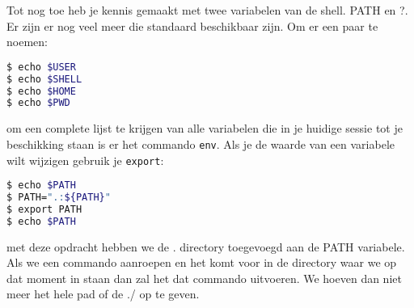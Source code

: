 Tot nog toe heb je kennis gemaakt met twee variabelen van de shell. PATH en ?. Er zijn er nog veel meer die standaard beschikbaar zijn. Om er een paar te noemen:
\begin{lstlisting}[language=bash]
$ echo $USER
$ echo $SHELL
$ echo $HOME
$ echo $PWD
\end{lstlisting}
om een complete lijst te krijgen van alle variabelen die in je huidige sessie tot je beschikking staan is er het commando \texttt{env}.
Als je de waarde van een variabele wilt wijzigen gebruik je \texttt{export}:
\begin{lstlisting}[language=bash]
$ echo $PATH
$ PATH=".:${PATH}"
$ export PATH
$ echo $PATH
\end{lstlisting}
met deze opdracht hebben we de . directory toegevoegd aan de PATH variabele. Als we een commando aanroepen en het komt voor in de directory waar we op dat moment in staan dan zal het dat commando uitvoeren. We hoeven dan niet meer het hele pad of de ./ op te geven.
